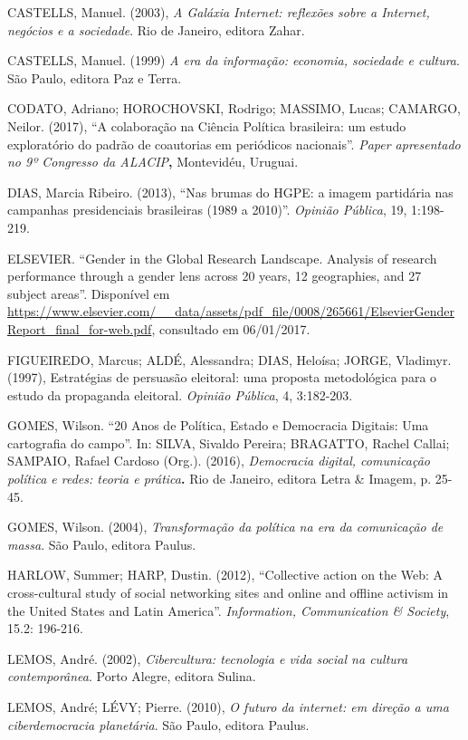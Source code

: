 CASTELLS, Manuel. (2003), \emph{A Galáxia Internet: reflexões sobre a
Internet, negócios e a sociedade}. Rio de Janeiro, editora Zahar.

CASTELLS, Manuel. (1999) \emph{A era da informação: economia, sociedade
e cultura}. São Paulo, editora Paz e Terra.

CODATO, Adriano; HOROCHOVSKI, Rodrigo; MASSIMO, Lucas; CAMARGO, Neilor.
(2017), ``A colaboração na Ciência Política brasileira: um estudo
exploratório do padrão de coautorias em periódicos nacionais''.
\emph{Paper apresentado no 9º Congresso da ALACIP}\textbf{,} Montevidéu,
Uruguai.

DIAS, Marcia Ribeiro. (2013), ``Nas brumas do HGPE: a imagem partidária
nas campanhas presidenciais brasileiras (1989 a 2010)''. \emph{Opinião
Pública}, 19, 1:198-219.

ELSEVIER. ``Gender in the Global Research Landscape. Analysis of
research performance through a gender lens across 20 years, 12
geographies, and 27 subject areas''. Disponível em
\url{https://www.elsevier.com/__data/assets/pdf_file/0008/265661/ElsevierGenderReport_final_for-web.pdf},
consultado em 06/01/2017.

FIGUEIREDO, Marcus; ALDÉ, Alessandra; DIAS, Heloísa; JORGE, Vladimyr.
(1997), Estratégias de persuasão eleitoral: uma proposta metodológica
para o estudo da propaganda eleitoral. \emph{Opinião Pública}, 4,
3:182-203.

GOMES, Wilson. ``20 Anos de Política, Estado e Democracia Digitais: Uma
cartografia do campo''. In: SILVA, Sivaldo Pereira; BRAGATTO, Rachel
Callai; SAMPAIO, Rafael Cardoso (Org.). (2016), \emph{Democracia
digital, comunicação política e redes: teoria e prática}\textbf{.} Rio
de Janeiro, editora Letra \& Imagem, p. 25-45.

GOMES, Wilson. (2004), \emph{Transformação da política na era da
comunicação de massa}. São Paulo, editora Paulus.

HARLOW, Summer; HARP, Dustin. (2012), ``Collective action on the Web: A
cross-cultural study of social networking sites and online and offline
activism in the United States and Latin America''. \emph{Information,
Communication \& Society}, 15.2: 196-216.

LEMOS, André. (2002), \emph{Cibercultura: tecnologia e vida social na
cultura contemporânea}. Porto Alegre, editora Sulina.

LEMOS, André; LÉVY; Pierre. (2010), \emph{O futuro da internet: em
direção a uma ciberdemocracia planetária}. São Paulo, editora Paulus.

